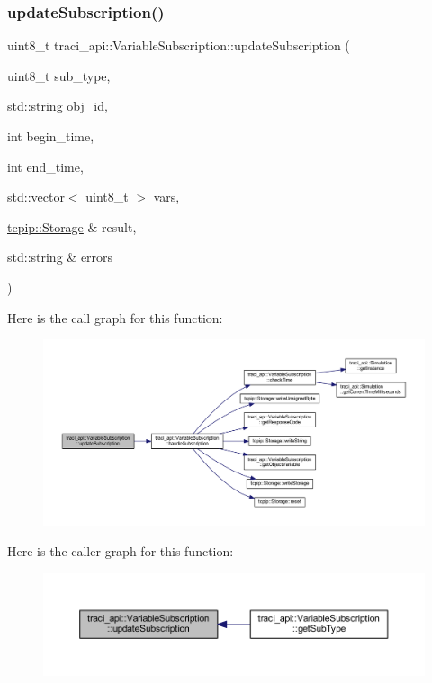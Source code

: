 \subsubsection{\texorpdfstring{update\+Subscription()}{updateSubscription()}}
{\footnotesize\ttfamily uint8\+\_\+t traci\+\_\+api\+::\+Variable\+Subscription\+::update\+Subscription (\begin{DoxyParamCaption}\item[{uint8\+\_\+t}]{sub\+\_\+type,  }\item[{std\+::string}]{obj\+\_\+id,  }\item[{int}]{begin\+\_\+time,  }\item[{int}]{end\+\_\+time,  }\item[{std\+::vector$<$ uint8\+\_\+t $>$}]{vars,  }\item[{\hyperlink{classtcpip_1_1_storage}{tcpip\+::\+Storage} \&}]{result,  }\item[{std\+::string \&}]{errors }\end{DoxyParamCaption})}

Here is the call graph for this function\+:
\nopagebreak
\begin{figure}[H]
\begin{center}
\leavevmode
\includegraphics[width=350pt]{classtraci__api_1_1_variable_subscription_a4a56033c7b432c2e2d029ca5fd5c3468_cgraph}
\end{center}
\end{figure}
Here is the caller graph for this function\+:
\nopagebreak
\begin{figure}[H]
\begin{center}
\leavevmode
\includegraphics[width=350pt]{classtraci__api_1_1_variable_subscription_a4a56033c7b432c2e2d029ca5fd5c3468_icgraph}
\end{center}
\end{figure}



